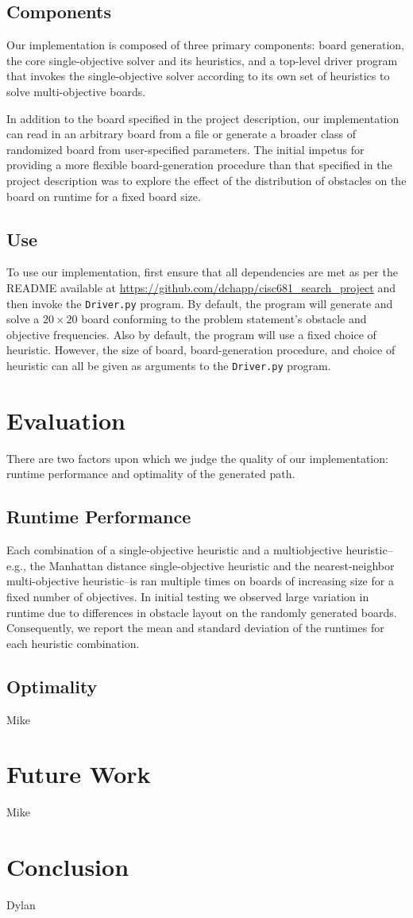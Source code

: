 \documentclass[12pt, conference, compsocconf]{IEEEtran}
\begin{document}
\subsection{Components}
Our implementation is composed of three primary components: board generation, the core single-objective solver and its heuristics, and a top-level driver program that invokes the single-objective solver according to its own set of heuristics to solve multi-objective boards. 

In addition to the board specified in the project description, our implementation can read in an arbitrary board from a file or generate a broader class of randomized board from user-specified parameters. 
The initial impetus for providing a more flexible board-generation procedure than that specified in the project description was to explore the effect of the distribution of obstacles on the board on runtime for a fixed board size.

\subsection{Use}
To use our implementation, first ensure that all dependencies are met as per the README available at \url{https://github.com/dchapp/cisc681_search_project} and then invoke the \texttt{Driver.py} program. 
By default, the program will generate and solve a $20 \times 20$ board conforming to the problem statement's obstacle and objective frequencies.
Also by default, the program will use a fixed choice of heuristic.
However, the size of board, board-generation procedure, and choice of heuristic can all be given as arguments to the \texttt{Driver.py} program. 

\section{Evaluation}
There are two factors upon which we judge the quality of our implementation: runtime performance and optimality of the generated path.  

\subsection{Runtime Performance}
Each combination of a single-objective heuristic and a multiobjective heuristic--e.g., the Manhattan distance single-objective heuristic and the nearest-neighbor multi-objective heuristic--is ran multiple times on boards of increasing size for a fixed number of objectives.
In initial testing we observed large variation in runtime due to differences in obstacle layout on the randomly generated boards. 
Consequently, we report the mean and standard deviation of the runtimes for each heuristic combination. 




\subsection{Optimality}
Mike

\section{Future Work}
Mike

\section{Conclusion}
Dylan



\end{document}
